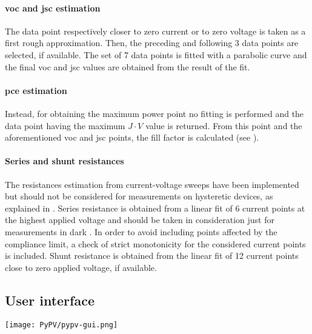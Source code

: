 				\paragraph{\Gls{voc} and \gls{jsc} estimation}
				The data point respectively closer to zero current or to zero voltage is taken as a first rough approximation.
				Then, the preceding and following 3 data points are selected, if available.
				The set of 7 data points is fitted with a parabolic curve and the final \gls{voc} and \gls{jsc} values are obtained from the result of the fit.
				
				\paragraph{\Gls{pce} estimation}
				Instead, for obtaining the maximum power point no fitting is performed and the data point having the maximum $J\cdot V$ value is returned.
				From this point and the aforementioned \gls{voc} and \gls{jsc} points, the fill factor is calculated (see ).
				
				\paragraph{Series and shunt resistances}
				The resistances estimation from current\hyp{}voltage sweeps have been implemented but should not be considered for measurements on hysteretic devices, as explained in .
				Series resistance is obtained from a linear fit of 6 current points at the highest applied voltage and should be taken in consideration just for measurements in dark \cite{Pysch2007}.
				In order to avoid including points affected by the compliance limit, a check of strict monotonicity for the considered current points is included.
				Shunt resistance is obtained from the linear fit of 12 current points close to zero applied voltage, if available.
				
				
		\subsection{User interface}
		
		\begin{sidewaysfigure}
								\centering
			\texttt{[image: PyPV/pypv-gui.png]}
			\label{fig:pypv-gui}
		\end{sidewaysfigure}

